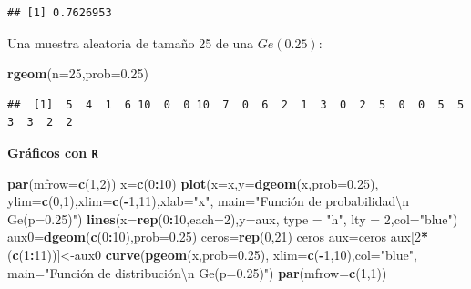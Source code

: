 \documentclass[]{book}
\newenvironment{Shaded}{\begin{snugshade}}{\end{snugshade}}
\newcommand{\CharTok}[1]{\textcolor[rgb]{0.31,0.60,0.02}{#1}}
\newcommand{\DataTypeTok}[1]{\textcolor[rgb]{0.13,0.29,0.53}{#1}}
\newcommand{\DecValTok}[1]{\textcolor[rgb]{0.00,0.00,0.81}{#1}}
\newcommand{\FloatTok}[1]{\textcolor[rgb]{0.00,0.00,0.81}{#1}}
\newcommand{\KeywordTok}[1]{\textcolor[rgb]{0.13,0.29,0.53}{\textbf{#1}}}
\newcommand{\NormalTok}[1]{#1}
\newcommand{\OperatorTok}[1]{\textcolor[rgb]{0.81,0.36,0.00}{\textbf{#1}}}
\newcommand{\StringTok}[1]{\textcolor[rgb]{0.31,0.60,0.02}{#1}}
\begin{document}
\begin{verbatim}
## [1] 0.7626953
\end{verbatim}

Una muestra aleatoria de tamaño 25 de una \(Ge(0.25)\):

\begin{Shaded}
\begin{Highlighting}[]
\KeywordTok{rgeom}\NormalTok{(}\DataTypeTok{n=}\DecValTok{25}\NormalTok{,}\DataTypeTok{prob=}\FloatTok{0.25}\NormalTok{)}
\end{Highlighting}
\end{Shaded}

\begin{verbatim}
##  [1]  5  4  1  6 10  0  0 10  7  0  6  2  1  3  0  2  5  0  0  5  5  3  3  2  2
\end{verbatim}

\textbf{Gráficos con \texttt{R}}

\begin{Shaded}
\begin{Highlighting}[]
\KeywordTok{par}\NormalTok{(}\DataTypeTok{mfrow=}\KeywordTok{c}\NormalTok{(}\DecValTok{1}\NormalTok{,}\DecValTok{2}\NormalTok{))}
\NormalTok{x=}\KeywordTok{c}\NormalTok{(}\DecValTok{0}\OperatorTok{:}\DecValTok{10}\NormalTok{)}
\KeywordTok{plot}\NormalTok{(}\DataTypeTok{x=}\NormalTok{x,}\DataTypeTok{y=}\KeywordTok{dgeom}\NormalTok{(x,}\DataTypeTok{prob=}\FloatTok{0.25}\NormalTok{),}
  \DataTypeTok{ylim=}\KeywordTok{c}\NormalTok{(}\DecValTok{0}\NormalTok{,}\DecValTok{1}\NormalTok{),}\DataTypeTok{xlim=}\KeywordTok{c}\NormalTok{(}\OperatorTok{-}\DecValTok{1}\NormalTok{,}\DecValTok{11}\NormalTok{),}\DataTypeTok{xlab=}\StringTok{"x"}\NormalTok{,}
  \DataTypeTok{main=}\StringTok{"Función de probabilidad}\CharTok{\textbackslash{}n}\StringTok{ Ge(p=0.25)"}\NormalTok{)}
\KeywordTok{lines}\NormalTok{(}\DataTypeTok{x=}\KeywordTok{rep}\NormalTok{(}\DecValTok{0}\OperatorTok{:}\DecValTok{10}\NormalTok{,}\DataTypeTok{each=}\DecValTok{2}\NormalTok{),}\DataTypeTok{y=}\NormalTok{aux, }\DataTypeTok{type =} \StringTok{"h"}\NormalTok{, }\DataTypeTok{lty =} \DecValTok{2}\NormalTok{,}\DataTypeTok{col=}\StringTok{"blue"}\NormalTok{)}
\NormalTok{aux0=}\KeywordTok{dgeom}\NormalTok{(}\KeywordTok{c}\NormalTok{(}\DecValTok{0}\OperatorTok{:}\DecValTok{10}\NormalTok{),}\DataTypeTok{prob=}\FloatTok{0.25}\NormalTok{)}
\NormalTok{ceros=}\KeywordTok{rep}\NormalTok{(}\DecValTok{0}\NormalTok{,}\DecValTok{21}\NormalTok{)}
\NormalTok{ceros}
\NormalTok{aux=ceros}
\NormalTok{aux[}\DecValTok{2}\OperatorTok{*}\NormalTok{(}\KeywordTok{c}\NormalTok{(}\DecValTok{1}\OperatorTok{:}\DecValTok{11}\NormalTok{))]<-aux0}
\KeywordTok{curve}\NormalTok{(}\KeywordTok{pgeom}\NormalTok{(x,}\DataTypeTok{prob=}\FloatTok{0.25}\NormalTok{),}
  \DataTypeTok{xlim=}\KeywordTok{c}\NormalTok{(}\OperatorTok{-}\DecValTok{1}\NormalTok{,}\DecValTok{10}\NormalTok{),}\DataTypeTok{col=}\StringTok{"blue"}\NormalTok{,}
  \DataTypeTok{main=}\StringTok{"Función de distribución\textbackslash{}n Ge(p=0.25)"}\NormalTok{)}
\KeywordTok{par}\NormalTok{(}\DataTypeTok{mfrow=}\KeywordTok{c}\NormalTok{(}\DecValTok{1}\NormalTok{,}\DecValTok{1}\NormalTok{))}
\end{Highlighting}
\end{Shaded}
\end{document}
